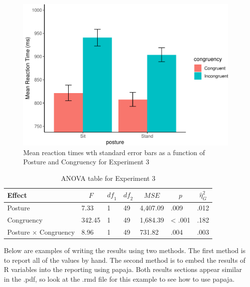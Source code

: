 \documentclass[
  english,
  man]{apa6}
\begin{document}
\begin{figure}
\centering
\includegraphics{manuscript_files/figure-latex/stroopfig-1.pdf}
\caption{\label{fig:stroopfig}Mean reaction times wth standard error bars as a function of Posture and Congruency for Experiment 3}
\end{figure}

\begin{table}[tbp]

\begin{center}
\begin{threeparttable}

\caption{\label{tab:aovtable}ANOVA table for Experiment 3}

\begin{tabular}{lllllll}
\toprule
Effect & \multicolumn{1}{c}{$F$} & \multicolumn{1}{c}{$\mathit{df}_1$} & \multicolumn{1}{c}{$\mathit{df}_2$} & \multicolumn{1}{c}{$\mathit{MSE}$} & \multicolumn{1}{c}{$p$} & \multicolumn{1}{c}{$\hat{\eta}^2_G$}\\
\midrule
Posture & 7.33 & 1 & 49 & 4,407.09 & .009 & .012\\
Congruency & 342.45 & 1 & 49 & 1,684.39 & < .001 & .182\\
Posture $\times$ Congruency & 8.96 & 1 & 49 & 731.82 & .004 & .003\\
\bottomrule
\end{tabular}

\end{threeparttable}
\end{center}

\end{table}

Below are examples of writing the results using two methods. The first method is to report all of the values by hand. The second method is to embed the results of R variables into the reporting using papaja. Both results sections appear similar in the .pdf, so look at the .rmd file for this example to see how to use papaja.
\end{document}
